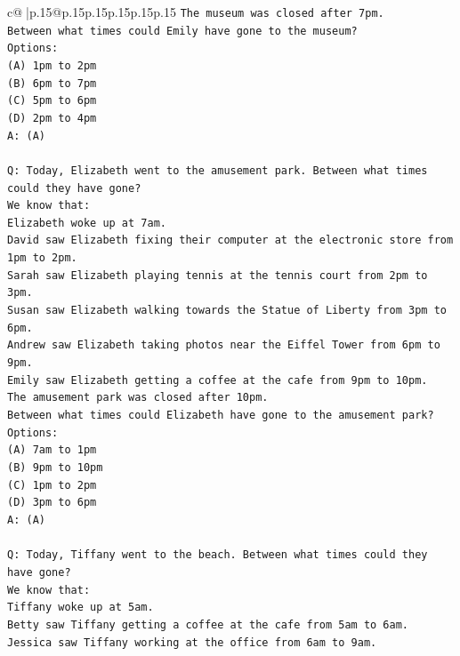 \documentclass{article}
\begin{document}
{\begin{supertabular}{c@{$\;$}|p{.15\linewidth}@{}p{.15\linewidth}p{.15\linewidth}p{.15\linewidth}p{.15\linewidth}p{.15\linewidth}}
{{{\texttt{The museum was closed after 7pm.} \\
\texttt{Between what times could Emily have gone to the museum?} \\
\texttt{Options:} \\
\texttt{(A) 1pm to 2pm} \\
\texttt{(B) 6pm to 7pm} \\
\texttt{(C) 5pm to 6pm} \\
\texttt{(D) 2pm to 4pm} \\
\texttt{A: (A)} \\
\\ 
\texttt{Q: Today, Elizabeth went to the amusement park. Between what times could they have gone?} \\
\texttt{We know that:} \\
\texttt{Elizabeth woke up at 7am.} \\
\texttt{David saw Elizabeth fixing their computer at the electronic store from 1pm to 2pm.} \\
\texttt{Sarah saw Elizabeth playing tennis at the tennis court from 2pm to 3pm.} \\
\texttt{Susan saw Elizabeth walking towards the Statue of Liberty from 3pm to 6pm.} \\
\texttt{Andrew saw Elizabeth taking photos near the Eiffel Tower from 6pm to 9pm.} \\
\texttt{Emily saw Elizabeth getting a coffee at the cafe from 9pm to 10pm.} \\
\texttt{The amusement park was closed after 10pm.} \\
\texttt{Between what times could Elizabeth have gone to the amusement park?} \\
\texttt{Options:} \\
\texttt{(A) 7am to 1pm} \\
\texttt{(B) 9pm to 10pm} \\
\texttt{(C) 1pm to 2pm} \\
\texttt{(D) 3pm to 6pm} \\
\texttt{A: (A)} \\
\\ 
\texttt{Q: Today, Tiffany went to the beach. Between what times could they have gone?} \\
\texttt{We know that:} \\
\texttt{Tiffany woke up at 5am.} \\
\texttt{Betty saw Tiffany getting a coffee at the cafe from 5am to 6am.} \\
\texttt{Jessica saw Tiffany working at the office from 6am to 9am.} \\
}}}
\end{supertabular}}
\end{document}
